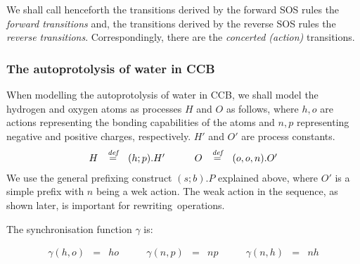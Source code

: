 \documentclass[runningheads]{llncs}
\newcommand{\bydef}{\stackrel{\emph{def}}{=}}
\begin{document}
We shall call henceforth the transitions derived by the forward SOS rules the \emph{forward transitions} 
and, the transitions derived by the reverse SOS rules the \emph{reverse transitions}.
Correspondingly, there are the \emph{concerted (action)} transitions. 

\subsubsection{The autoprotolysis of water in CCB}

When modelling the autoprotolysis of water in CCB, we shall model the hydrogen and oxygen atoms as processes $H$ and $O$ as follows, where 
$h,o$ are actions representing the bonding capabilities of the atoms and $n,p$ 
representing negative and positive charges, respectively. $H'$ and $O'$ are process constants.
$$\begin{array}{lllllll}
H & \bydef & (h;p).H' & \quad & O & \bydef & (o,o,n).O'
\end{array}$$
We use the general prefixing construct $(s;b).P$ explained above, where $O'$ is a simple prefix with $n$ being a wek 
action. The weak action in the sequence, as shown later, is important for rewriting~operations.  

The synchronisation function $\gamma$ is:

$$\begin{array}{lllllllll}
\gamma(h,o) & = & ho \qquad &
\gamma(n,p) & = & np \qquad &
\gamma(n,h) & = & nh
\end{array}$$
\end{document}
